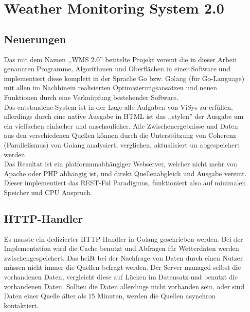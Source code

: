 \section{Weather Monitoring System 2.0}
\subsection{Neuerungen} %
Das mit dem Namen ,,WMS 2.0'' betitelte Projekt vereint die in dieser Arbeit genannten
Programme, Algorithmen und Oberflächen in einer Software und implementiert diese komplett
in der Sprache Go bzw. Golang (für Go-Language) mit allen im Nachhinein realisierten
Optimisierungsansätzen und neuen Funktionen durch eine Verknüpfung bestehender Software.\\
Das entstandene System ist in der Lage alle Aufgaben von ViSys zu erfüllen, allerdings durch
eine native Ausgabe in HTML ist das ,,stylen'' der Ausgabe um ein vielfachen einfacher und
anschaulicher. Alle Zwischenergebnisse und Daten aus den verschiedenen Quellen können durch
die Unterstützung von Coherenz (Parallelismus) von Golang analysiert, verglichen, aktualisiert
un abgespeichert werden.\\
Das Resultat ist ein platformunabhängiger Webserver, welcher nicht mehr von Apache oder PHP
abhängig ist, und direkt Quellenabgleich und Ausgabe vereint. Dieser implementiert das REST-Ful
Paradigmus, funktioniert also auf minimalen Speicher und CPU Anspruch. \\

\subsection{HTTP-Handler} %
Es musste ein dedizierter HTTP-Handler in Golang geschrieben werden. Bei der Implementation
wird die Cache benutzt und Abfragen für Wetterdaten werden zwischengespeichert. Das heißt bei der
Nachfrage von Daten durch einen Nutzer müssen nicht immer die Quellen befragt werden. Der Server
managed selbst die vorhandenen Daten, vergleicht diese auf Lücken im Datensatz und benutzt die
vorhandenen Daten. Sollten die Daten allerdings nicht vorhanden sein, oder sind Daten einer Quelle
älter als 15 Minuten, werden die Quellen asynchron kontaktiert.\\

